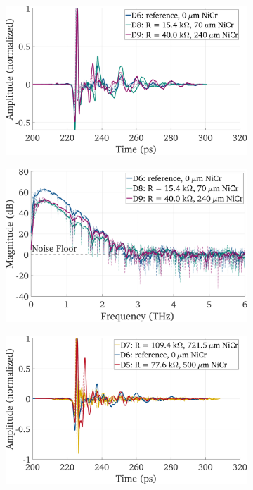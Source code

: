 \begin{figure}[!]
    \centering
    \begin{subfigure}[b]{0.49\textwidth}
        \centering
        \includegraphics[height=0.6\textwidth]{figures/Results/mainTextComp/D6_D8_D9/D6_D8_D9_MA_time_norm.pdf}
        \caption{\centering}
        \label{comp_d6_d8_d9_time}
    \end{subfigure}
    \hfill
    \begin{subfigure}[b]{0.49\textwidth}
        \centering
        \includegraphics[height=0.6\textwidth]{figures/Results/mainTextComp/D6_D8_D9/D6_D8_D9_spectrum.pdf}
        \caption{\centering}
        \label{comp_d6_d8_d9_spec}
    \end{subfigure}
    \hfill
    \begin{subfigure}[b]{0.49\textwidth}
        \centering
        \includegraphics[height=0.6\textwidth]{figures/Results/mainTextComp/D6_D5_D7/D6_D5_D7_MA_time_norm.pdf}

\end{subfigure}
\end{figure}
